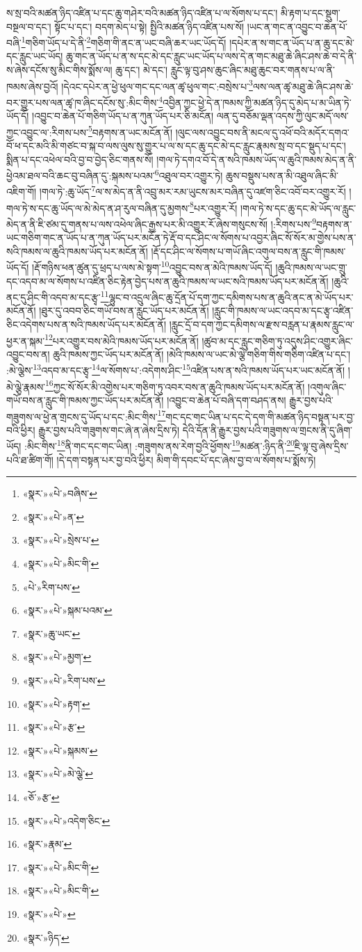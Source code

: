 ས་སྲ་བའི་མཚན་ཉིད་འཛིན་པ་དང་ཆུ་གཤེར་བའི་མཚན་ཉིད་འཛིན་པ་ལ་སོགས་པ་དང་། མི་རྟག་པ་དང་སྡུག་བསྔལ་བ་དང་། སྟོང་པ་དང་། བདག་མེད་པ་སྟེ། སྤྱིའི་མཚན་ཉིད་འཛིན་པས་སོ། །ཡང་ན་གང་ན་འབྱུང་བ་ཆེན་པོ་བཞི་\footnote{«སྣར་»«པེ་»བཞིས་}གཅིག་ཡོད་པ་དེ་ནི་\footnote{«སྣར་»«པེ་»ན་}གཅིག་གི་ནང་ན་ཡང་བཞི་ཆར་ཡང་ཡོད་དོ། །དཔེར་ན་ས་གང་ན་ཡོད་པ་ན་ཆུ་དང་མེ་དང་རླུང་ཡང་ཡོད། ཆུ་གང་ན་ཡོད་པ་ན་ས་དང་མེ་དང་རླུང་ཡང་ཡོད་པ་ལས་དེ་ན་གང་མཐུ་ཆེ་ཞིང་ཤས་ཆེ་བ་དེ་ནི་ས་ཞེས་དངོས་སུ་མིང་གིས་སྨོས་ལ། ཆུ་དང་། མེ་དང་། རླུང་ལྟ་བུ་ཤས་ཆུང་ཞིང་མཐུ་ཆུང་བར་གནས་པ་ལ་ནི་ཁམས་ཞེས་བྱའོ། །དེའང་དཔེར་ན་ཕྱེ་ཕུལ་གང་དང་ལན་ཚྭ་ཕུལ་གང་:བསྲེས་པ་\footnote{«སྣར་»«པེ་»སྲེས་པ་}ལས་ལན་ཚྭ་མཐུ་ཆེ་ཞིང་ཤས་ཆེ་བར་གྱུར་པས་ལན་ཚྭ་ཁ་ཞིང་དངོས་སུ་:མིང་གིས་\footnote{«སྣར་»«པེ་»མིང་གི་}འབྱིན་ཀྱང་ཕྱེ་དེ་ན་ཁམས་ཀྱི་མཚན་ཉིད་དུ་མེད་པ་མ་ཡིན་ཏེ་ཡོད་དོ། །འབྱུང་བ་ཆེན་པོ་གཅིག་ཡོད་པ་ན་ཀུན་ཡོད་པར་ཅི་མངོན། ལན་དུ་བཅོམ་ལྡན་འདས་ཀྱི་ལུང་མདོ་ལས་ཀྱང་འབྱུང་ལ་:རིགས་པས་\footnote{«པེ་»རིག་པས་}བརྟགས་ན་ཡང་མངོན་ནོ། །ལུང་ལས་འབྱུང་བས་ནི་མངལ་དུ་འཕོ་བའི་མདོར་དགའ་བོ་ཕ་དང་མའི་མི་གཙང་བ་སྐ་བ་ལས་ལུས་སུ་གྱུར་པ་ལ་ས་དང་ཆུ་དང་མེ་དང་རླུང་རྣམས་སྲ་བ་དང་སྡུད་པ་དང་། སྨིན་པ་དང་འཕེལ་བའི་བྱ་བ་བྱེད་ཅིང་གནས་སོ། །གལ་ཏེ་དགའ་བོ་དེ་ན་སའི་ཁམས་ཡོད་ལ་ཆུའི་ཁམས་མེད་ན་ནི་ཕྱེའམ་ཐལ་བའི་ཆང་བུ་བཞིན་དུ་:སྐམས་པའམ་\footnote{«སྣར་»«པེ་»སྐམ་པའམ་}འཐུལ་བར་འགྱུར་ཏེ། ཆུས་བསྡུས་པས་ན་མི་འཐུལ་ཞིང་མི་འཇིག་གོ། །གལ་ཏེ་:ཆུ་ཡོད་\footnote{«སྣར་»ཆུ་ཡང་}ལ་ས་མེད་ན་ནི་འབྲུ་མར་རམ་ཡུངས་མར་བཞིན་དུ་འཛག་ཅིང་འབོ་བར་འགྱུར་རོ། །གལ་ཏེ་ས་དང་ཆུ་ཡོད་ལ་མེ་མེད་ན་ཤ་རུལ་བཞིན་དུ་མྱགས་\footnote{«སྣར་»«པེ་»མྱག་}པར་འགྱུར་རོ། །གལ་ཏེ་ས་དང་ཆུ་དང་མེ་ཡོད་ལ་རླུང་མེད་ན་ནི་ཇི་ཙམ་དུ་གནས་པ་ལས་འཕེལ་ཞིང་རྒྱས་པར་མི་འགྱུར་རོ་ཞེས་གསུངས་སོ། །:རིགས་པས་\footnote{«སྣར་»«པེ་»རིག་པས་}བརྟགས་ན་ཡང་གཅིག་གང་ན་ཡོད་པ་ན་ཀུན་ཡོད་པར་མངོན་ཏེ་རྡོ་བ་དང་ཤིང་ལ་སོགས་པ་འབྱར་ཞིང་སོ་སོར་མ་གྱེས་པས་ན་སའི་ཁམས་ལ་ཆུའི་ཁམས་ཡོད་པར་མངོན་ནོ། །རྡོ་དང་ཤིང་ལ་སོགས་པ་གཡོ་ཞིང་འགུལ་བས་ན་རླུང་གི་ཁམས་ཡོད་དོ། །རྡོ་གཉིས་ཕན་ཚུན་དུ་ཕྲད་པ་ལས་མེ་སྟག་\footnote{«སྣར་»«པེ་»རྟག་}འབྱུང་བས་ན་མེའི་ཁམས་ཡོད་དོ། །ཆུའི་ཁམས་ལ་ཡང་གྲུ་དང་འདབ་མ་ལ་སོགས་པ་འཛིན་ཅིང་རྟེན་བྱེད་པས་ན་ཆུའི་ཁམས་ལ་ཡང་སའི་ཁམས་ཡོད་པར་མངོན་ནོ། །ཆུའི་ནང་དུ་ཤིང་གི་འདབ་མ་དང་རྩྭ་\footnote{«སྣར་»«པེ་»རྩ་}ལྷུང་བ་འདྲུལ་ཞིང་ཆུ་དྲོན་པོ་དག་ཀྱང་དམིགས་པས་ན་ཆུའི་ནང་ན་མེ་ཡོད་པར་མངོན་ནོ། །ཐུར་དུ་འབབ་ཅིང་གཡོ་བས་ན་རླུང་ཡོད་པར་མངོན་ནོ། །རླུང་གི་ཁམས་ལ་ཡང་འདབ་མ་དང་རྩྭ་འཛིན་ཅིང་འདེགས་པས་ན་སའི་ཁམས་ཡོད་པར་མངོན་ནོ། །རླུང་དྲོ་བ་དག་ཀྱང་དམིགས་ལ་རྫས་བརླན་པ་རྣམས་རླུང་ལ་ཕྱར་ན་སྐམ་\footnote{«སྣར་»«པེ་»སྐམས་}པར་འགྱུར་བས་མེའི་ཁམས་ཡོད་པར་མངོན་ནོ། །ཚུབ་མ་དང་རླུང་གཅིག་ཏུ་འདུས་ཤིང་འགྱུར་ཞིང་འབྱུང་བས་ན། ཆུའི་ཁམས་ཀྱང་ཡོད་པར་མངོན་ནོ། །མེའི་ཁམས་ལ་ཡང་མེ་ལྕེ་གཅིག་གིས་གཅིག་འཛིན་པ་དང་། :མེ་ལྕེས་\footnote{«སྣར་»«པེ་»མེ་ལྕེ་}འདབ་མ་དང་རྩྭ་\footnote{«ཅོ་»རྩ་}ལ་སོགས་པ་:འདེགས་ཤིང་\footnote{«སྣར་»«པེ་»འདེག་ཅིང་}འཛིན་པས་ན་སའི་ཁམས་ཡོད་པར་ཡང་མངོན་ནོ། །མེ་ལྕེ་རྣམས་\footnote{«སྣར་»རྣམ་}ཀྱང་སོ་སོར་མི་འགྱེས་པར་གཅིག་ཏུ་འབར་བས་ན་ཆུའི་ཁམས་ཡོད་པར་མངོན་ནོ། །འགུལ་ཞིང་གཡོ་བས་ན་རླུང་གི་ཁམས་ཀྱང་ཡོད་པར་མངོན་ནོ། །འབྱུང་བ་ཆེན་པོ་བཞི་དག་བཤད་ནས། རྒྱུར་བྱས་པའི་གཟུགས་ལ་ཕྱེ་ན་གྲངས་དུ་ཡོད་པ་དང་:མིང་གིས་\footnote{«སྣར་»«པེ་»མིང་གི་}གང་དང་གང་ཡིན་པ་དང་དེ་དག་གི་མཚན་ཉིད་བསྟན་པར་བྱ་བའི་ཕྱིར། རྒྱུར་བྱས་པའི་གཟུགས་གང་ཞེ་ན་ཞེས་དྲིས་ཏེ། དེའི་དོན་ནི་རྒྱུར་བྱས་པའི་གཟུགས་ལ་གྲངས་ནི་དུ་ཞིག་ཡོད། :མིང་གིས་\footnote{«སྣར་»«པེ་»མིང་གི་}ནི་གང་དང་གང་ཡིན། :གཟུགས་ནས་རེག་བྱའི་ཕྱོགས་\footnote{«སྣར་»«པེ་»}མཚན་:ཉིད་ནི་\footnote{«སྣར་»ཉིད་}ཇི་ལྟ་བུ་ཞེས་དྲིས་པའི་ཐ་ཚིག་གོ། །དེ་དག་བསྟན་པར་བྱ་བའི་ཕྱིར། མིག་གི་དབང་པོ་དང་ཞེས་བྱ་བ་ལ་སོགས་པ་སྨོས་ཏེ། 